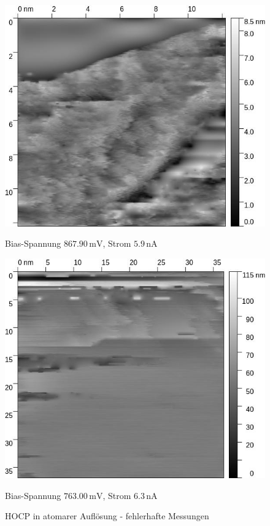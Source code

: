 \documentclass[12pt,a4paper]{scrartcl}
\numberwithin{equation}{section} %
\begin{document}
\begin{figure}[h!]
\begin{minipage}{\textwidth}
		\begin{minipage}[t]{0.5\textwidth}
			\includegraphics[width=\textwidth]{../media/B2.5/Graphit_2.jpg}
			\caption{Bias-Spannung $867.90 \mathrm{\,mV}$,
				Strom $5.9 \mathrm{\,nA}$}
		\end{minipage}
		\begin{minipage}[t]{0.5\textwidth}
			\centering
			\includegraphics[width=\textwidth]{../media/B2.5/Graphit_4.jpg}
			\caption{Bias-Spannung $763.00 \mathrm{\,mV}$,
				Strom $6.3 \mathrm{\,nA}$}
		\end{minipage}
		\caption{HOCP in atomarer Auflösung - fehlerhafte Messungen}
		\label{abb:hocp own: atomar}
	\end{minipage}
\end{figure}
\end{document}
